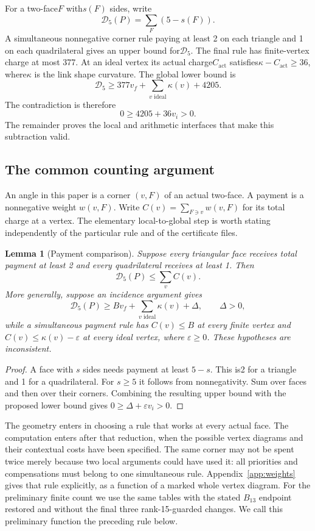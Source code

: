 \documentclass[11pt]{article}
\newtheorem{lemma}[theorem]{Lemma}
\theoremstyle{remark}\newtheorem{remark}[theorem]{Remark}
\newcommand{\Dfive}{\mathcal D_5}
\newcommand{\act}{\mathrm{act}}
\begin{document}
For a two-face$F$ with$s(F)$ sides, write
\[
 \Dfive(P)=\sum_F(5-s(F)).
\]
A simultaneous nonnegative corner rule paying at least 2 on each triangle
and 1 on each quadrilateral gives an upper bound for$\Dfive$. The final
rule has finite-vertex charge at most 377. At an ideal vertex its actual
charge$C_{\act}$ satisfies$\kappa-C_{\act}\ge36$, where$\kappa$ is the
link shape curvature. The global lower bound is
\[
 \Dfive\ge377v_f+\sum_{v\text{ ideal}}\kappa(v)+4205.
\]
The contradiction is therefore
\[
 0\ge4205+36v_i>0.
\]
The remainder proves the local and arithmetic interfaces that make this
subtraction valid.

\subsection{The common counting argument}

An angle in this paper is a corner $(v,F)$ of an actual two-face.
A payment is a nonnegative weight $w(v,F)$. Write
$C(v)=\sum_{F\ni v}w(v,F)$ for its total charge at a vertex.
The elementary local-to-global step is worth stating independently
of the particular rule and of the certificate files.

\begin{lemma}[Payment comparison]\label{lem:payment-comparison}
Suppose every triangular face receives total payment at least 2
and every quadrilateral receives at least 1. Then
\[
 \Dfive(P)\le\sum_v C(v).
\]
More generally, suppose an incidence argument gives
\[
 \Dfive(P)\ge Bv_f+\sum_{v\text{ ideal}}\kappa(v)+\Delta,
 \qquad\Delta>0,
\]
while a simultaneous payment rule has $C(v)\le B$ at every finite
vertex and $C(v)\le\kappa(v)-\varepsilon$ at every ideal vertex,
where $\varepsilon\ge0$. These hypotheses are inconsistent.
\end{lemma}
\begin{proof}
A face with $s$ sides needs payment at least $5-s$. This is2
for a triangle and 1 for a quadrilateral. For $s\ge5$ it follows
from nonnegativity. Sum over faces and then over their corners.
Combining the resulting upper bound with the proposed lower bound
gives $0\ge\Delta+\varepsilon v_i>0$.
\end{proof}

The geometry enters in choosing a rule that works at every actual
face. The computation enters after that reduction, when the possible
vertex diagrams and their contextual costs have been specified.
The same corner may not be spent twice merely because two local
arguments could have used it: all priorities and compensations must
belong to one simultaneous rule.
Appendix~\ref{app:weights} gives that rule explicitly, as a function
of a marked whole vertex diagram. For the preliminary finite count
we use the same tables with the stated $B_{13}$ endpoint restored
and without the final three rank-15-guarded changes. We call this
preliminary function the preceding rule below.
\end{document}

